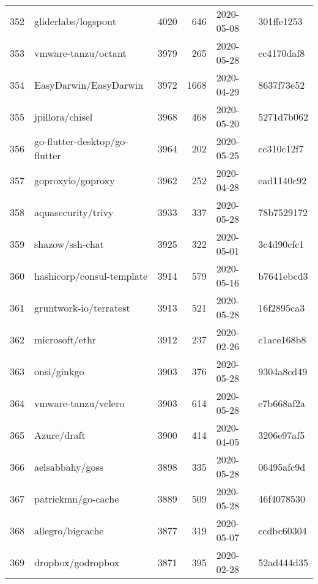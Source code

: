 \begin{longtable}{llrrll}
    352 &                                gliderlabs/logspout &   4020 &    646 & 2020-05-08 &  301ffe1253 \\
    353 &                                vmware-tanzu/octant &   3979 &    265 & 2020-05-28 &  ec4170daf8 \\
    354 &                              EasyDarwin/EasyDarwin &   3972 &   1668 & 2020-04-29 &  8637f73e52 \\
    355 &                                    jpillora/chisel &   3968 &    468 & 2020-05-20 &  5271d7b062 \\
    356 &                      go-flutter-desktop/go-flutter &   3964 &    202 & 2020-05-25 &  cc310c12f7 \\
    357 &                                  goproxyio/goproxy &   3962 &    252 & 2020-04-28 &  ead1140c92 \\
    358 &                                 aquasecurity/trivy &   3933 &    337 & 2020-05-28 &  78b7529172 \\
    359 &                                    shazow/ssh-chat &   3925 &    322 & 2020-05-01 &  3c4d90cfc1 \\
    360 &                          hashicorp/consul-template &   3914 &    579 & 2020-05-16 &  b7641ebcd3 \\
    361 &                             gruntwork-io/terratest &   3913 &    521 & 2020-05-28 &  16f2895ca3 \\
    362 &                                     microsoft/ethr &   3912 &    237 & 2020-02-26 &  c1ace168b8 \\
    363 &                                        onsi/ginkgo &   3903 &    376 & 2020-05-28 &  9304a8cd49 \\
    364 &                                vmware-tanzu/velero &   3903 &    614 & 2020-05-28 &  e7b668af2a \\
    365 &                                        Azure/draft &   3900 &    414 & 2020-04-05 &  3206e97af5 \\
    366 &                                    aelsabbahy/goss &   3898 &    335 & 2020-05-28 &  06495afc9d \\
    367 &                                 patrickmn/go-cache &   3889 &    509 & 2020-05-28 &  46f4078530 \\
    368 &                                   allegro/bigcache &   3877 &    319 & 2020-05-07 &  ccdbc60304 \\
    369 &                                  dropbox/godropbox &   3871 &    395 & 2020-02-28 &  52ad444d35 \\

\end{longtable}
